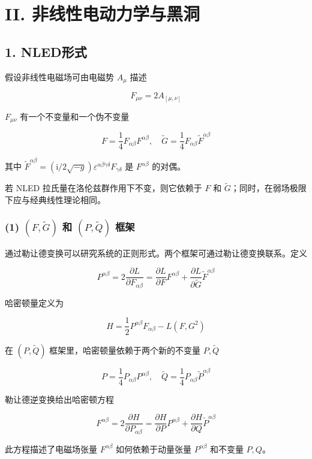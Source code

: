 \documentclass[aps,prl,preprint,groupedaddress]{revtex4-2}
\begin{document}
\section{II. 非线性电动力学与黑洞}

\subsection{1. NLED形式}

假设非线性电磁场可由电磁势 $A_\mu$ 描述

$$
F_{\mu\nu}
=2A_{[\mu,\nu]}
$$

$F_{\mu\nu}$ 有一个不变量和一个伪不变量

$$
F = \frac{1 }{4 } F_{\alpha\beta}F^{\alpha\beta},\quad
\tilde{G} = \frac{1 }{4 } F_{\alpha\beta} \tilde{F}^{\alpha\beta} 
$$

其中 $\tilde{F}^{\alpha\beta}=\left(\mathrm{i}/2\sqrt{-g} \right)\varepsilon^{\alpha\beta\gamma\delta}F_{\gamma\delta}$ 是 $F^{\alpha\beta}$ 的对偶。

若 NLED 拉氏量在洛伦兹群作用下不变，则它依赖于 $F$ 和 $\tilde{G}$；同时，在弱场极限下应与经典线性理论相同。

\subsubsection{(1) $(F,\tilde{G})$ 和 $(P,\tilde{Q})$ 框架}

通过勒让德变换可以研究系统的正则形式。两个框架可通过勒让德变换联系。定义

$$
P^{\alpha\beta}
=2\frac{\partial L }{\partial F_{\alpha\beta} } 
=\frac{\partial L }{\partial F } F^{\alpha\beta} + \frac{\partial L }{\partial \tilde{G} } \tilde{F}^{\alpha\beta}
$$

哈密顿量定义为

$$
H
=\frac{1 }{2 } P^{\alpha\beta} F_{\alpha\beta} - L\left(F,G^2 \right)
$$

在 $(P,\tilde{Q})$ 框架里，哈密顿量依赖于两个新的不变量 $P,\tilde{Q}$

$$
P = \frac{1 }{4 } P_{\alpha\beta} P^{\alpha\beta},\quad
\tilde{Q} = \frac{1 }{4 } P_{\alpha\beta}\tilde{P}^{\alpha\beta}
$$

勒让德逆变换给出哈密顿方程

$$
F^{\alpha\beta}
=2\frac{\partial H }{\partial P_{\alpha\beta} } 
=\frac{\partial H }{\partial P } P^{\alpha\beta} + \frac{\partial H }{\partial Q } \tilde{P}^{\alpha\beta}
$$

此方程描述了电磁场张量 $F^{\alpha\beta}$ 如何依赖于动量张量 $P^{\alpha\beta}$ 和不变量 $P,Q$。
\end{document}
